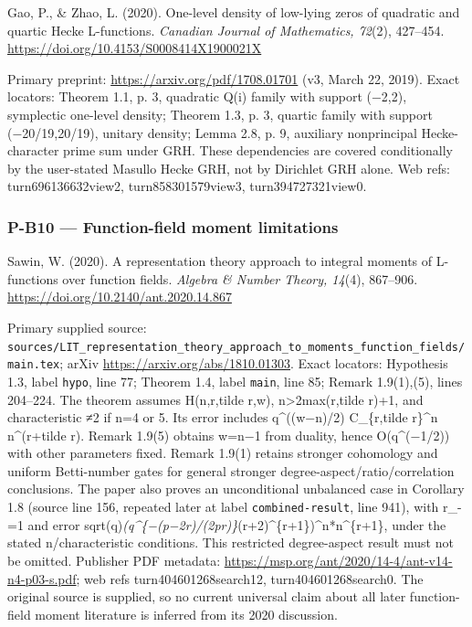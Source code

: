 \documentclass[11pt,a4paper]{article}
\theoremstyle{definition}\newtheorem{definition}{Definition}
\begin{document}
Gao, P., \& Zhao, L. (2020). One-level density of low-lying zeros of
quadratic and quartic Hecke L-functions. \emph{Canadian Journal of
Mathematics, 72}(2), 427--454.
\url{https://doi.org/10.4153/S0008414X1900021X}

Primary preprint: \url{https://arxiv.org/pdf/1708.01701} (v3, March 22,
2019). Exact locators: Theorem 1.1, p. 3, quadratic Q(i) family with
support (−2,2), symplectic one-level density; Theorem 1.3, p. 3, quartic
family with support (−20/19,20/19), unitary density; Lemma 2.8, p. 9,
auxiliary nonprincipal Hecke-character prime sum under GRH. These
dependencies are covered conditionally by the user-stated Masullo Hecke
GRH, not by Dirichlet GRH alone. Web refs: turn696136632view2,
turn858301579view3, turn394727321view0.

\subsubsection{P-B10 --- Function-field moment
limitations}\label{p-b10--function-field-moment-limitations}

Sawin, W. (2020). A representation theory approach to integral moments
of L-functions over function fields. \emph{Algebra \& Number Theory,
14}(4), 867--906. \url{https://doi.org/10.2140/ant.2020.14.867}

Primary supplied source:
\texttt{sources/LIT\_representation\_theory\_approach\_to\_moments\_function\_fields/main.tex};
arXiv \url{https://arxiv.org/abs/1810.01303}. Exact locators: Hypothesis
1.3, label \texttt{hypo}, line 77; Theorem 1.4, label \texttt{main},
line 85; Remark 1.9(1),(5), lines 204--224. The theorem assumes
H(n,r,tilde r,w), n\textgreater2max(r,tilde r)+1, and characteristic ≠2
if n=4 or 5. Its error includes q\^{}((w−n)/2) C\_\{r,tilde r\}\^{}n
n\^{}(r+tilde r). Remark 1.9(5) obtains w=n−1 from duality, hence
O(q\^{}(−1/2)) with other parameters fixed. Remark 1.9(1) retains
stronger cohomology and uniform Betti-number gates for general stronger
degree-aspect/ratio/correlation conclusions. The paper also proves an
unconditional unbalanced case in Corollary 1.8 (source line 156,
repeated later at label \texttt{combined-result}, line 941), with r\_-=1
and error
sqrt(q)\emph{(q\^{}\{−(p−2r)/(2pr)\}}(r+2)\^{}\{r+1\})\^{}n*n\^{}\{r+1\},
under the stated n/characteristic conditions. This restricted
degree-aspect result must not be omitted. Publisher PDF metadata:
\url{https://msp.org/ant/2020/14-4/ant-v14-n4-p03-s.pdf}; web refs
turn404601268search12, turn404601268search0. The original source is
supplied, so no current universal claim about all later function-field
moment literature is inferred from its 2020 discussion.
\end{document}
